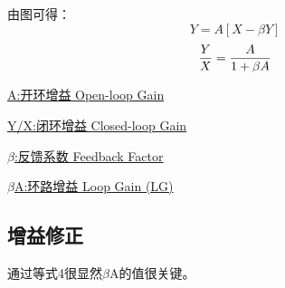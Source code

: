 \documentclass[]{ctexart}
\begin{document}
    由图可得：
    \begin{equation}
        Y=A[X-{\beta}Y]
    \end{equation}
    \begin{equation}
        {Y \over X}={A \over 1+{\beta}A}
    \end{equation}

    \underline{A:开环增益 Open-loop Gain}

    \underline{Y/X:闭环增益 Closed-loop Gain}

    \underline{$\beta$:反馈系数 Feedback Factor}

    \underline{$\beta$A:环路增益 Loop Gain (LG)}

\subsection{增益修正}
    通过等式4很显然$\beta$A的值很关键。
\end{document}
